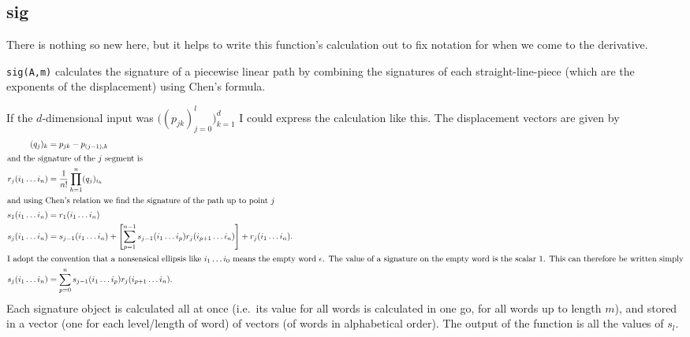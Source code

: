 \subsection{sig}
There is nothing so new here, but it helps to write this function's calculation out to fix notation for when we come to the derivative.

\verb|sig(A,m)| calculates the signature of a piecewise linear path by combining the signatures of each straight-line-piece (which are the exponents of the displacement) using Chen's formula. 

If the $d$-dimensional input was $\big((p_{jk})_{j=0}^l\big)_{k=1}^d$ %
 I could express the calculation like this. The displacement vectors are given by
\begin{align}
(q_j)_k &= p_{jk}-p_{(j-1),k} \\%
\shortintertext{and the signature of the $j$ segment is}
r_j(i_1\dots i_n) &= \frac1{n!}\prod_{h=1}^n(q_j)_{i_h}\label{eq:exp}\\%
\shortintertext{and using Chen's relation we find the signature of the path up to point $j$}
s_1(i_1\dots i_n) &= r_1(i_1\dots i_n) \nonumber
\\
s_j(i_1\dots i_n) &= s_{j-1}(i_1\dots i_n)+\left[\sum_{p=1}^{n-1} s_{j-1}(i_1\dots i_p)r_j(i_{p+1}\dots i_n)\right]+r_j(i_1\dots i_n).\\%
\shortintertext{I adopt the convention that a nonsensical ellipsis like $i_1\dots i_0$ means the empty word $\emptyword$. The value of a signature on the empty word is the scalar 1. This can therefore be written simply}
s_j(i_1\dots i_n)&= \sum_{p=0}^n s_{j-1}(i_1\dots i_p)r_j(i_{p+1}\dots i_n).\nonumber
\end{align}
Each signature object is calculated all at once (i.e.~its value for all words is calculated in one go, for all words up to length $m$), and stored in a vector (one for each level/length of word) of vectors (of words in alphabetical order). The output of the function is all the values of $s_l$.
